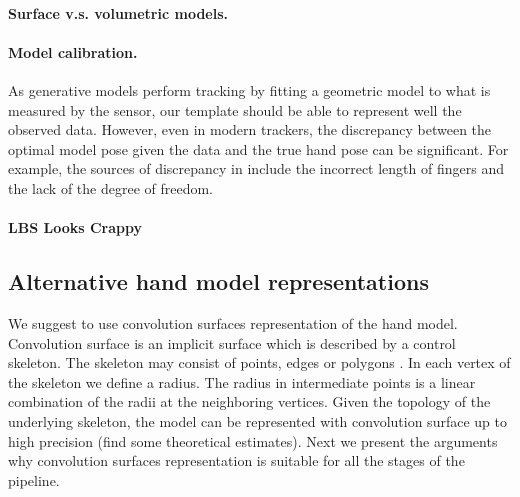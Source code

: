 \paragraph{Surface v.s. volumetric models.}


\paragraph{Model calibration.}

As generative models perform tracking by fitting a geometric model to what is measured by the sensor, our template should be able to represent well the observed data. However, even in modern trackers, the discrepancy between the optimal model pose given the data and the true hand pose can be significant. For example, the sources of discrepancy in  include the incorrect length of fingers and the lack of the  degree of freedom. 

\paragraph{LBS Looks Crappy}






\subsection{Alternative hand model representations}
We suggest to use convolution surfaces representation of the hand model. Convolution surface is an implicit surface which is described by a control skeleton. The skeleton may consist of points, edges or polygons \cite{bloomenthal1991convolution}. In each vertex of the skeleton we define a radius. The radius in intermediate points is a linear combination of the radii at the neighboring vertices. Given the topology of the underlying skeleton, the model can be represented with convolution surface up to high precision \textcolor{mygray}{(find some theoretical estimates).} Next we present the arguments why convolution surfaces representation is suitable for all the stages of the pipeline.

